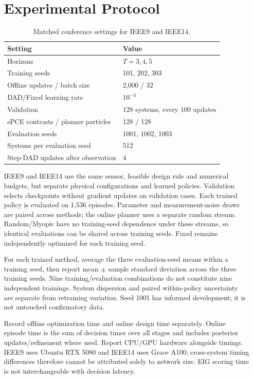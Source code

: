 \documentclass[conference]{IEEEtran}
\begin{document}
\section{Experimental Protocol}
\begin{table}[t]
\caption{Matched conference settings for IEEE9 and IEEE14.}
\centering\small
\begin{tabular}{ll}
\toprule Setting & Value\\\midrule
Horizons & $T=3,4,5$\\
Training seeds & 101, 202, 303\\
Offline updates / batch size & 2,000 / 32\\
DAD/Fixed learning rate & $10^{-3}$\\
Validation & 128 systems, every 100 updates\\
sPCE contrasts / planner particles & 128 / 128\\
Evaluation seeds & 1001, 1002, 1003\\
Systems per evaluation seed & 512\\
Step-DAD updates after observation & 4\\
\bottomrule
\end{tabular}
\label{tab:settings}
\end{table}
IEEE9 and IEEE14 use the same sensor, feasible design rule and numerical
budgets, but separate physical configurations and learned policies.
Validation selects checkpoints without gradient updates on validation cases.
Each trained policy is evaluated on 1,536 episodes. Parameter and
measurement-noise draws are paired across methods; the online planner uses
a separate random stream. Random/Myopic have no training-seed dependence
under these streams, so identical evaluations can be shared across training
seeds. Fixed remains independently optimized for each training seed.

For each trained method, average the three evaluation-seed means within a
training seed, then report mean $\pm$ sample standard deviation across
the three training seeds. Nine training/evaluation combinations do not
constitute nine independent trainings. System dispersion and paired
within-policy uncertainty are separate from retraining variation.
Seed 1001 has informed development; it is not untouched confirmatory data.

Record offline optimization time and online design time separately.
Online episode time is the sum of decision times over all stages and
includes posterior updates/refinement where used. Report CPU/GPU hardware
alongside timings. IEEE9 uses Ubuntu RTX 5080 and IEEE14 uses Grace A100;
cross-system timing differences therefore cannot be attributed solely to
network size. EIG scoring time is not interchangeable with decision latency.
\end{document}
